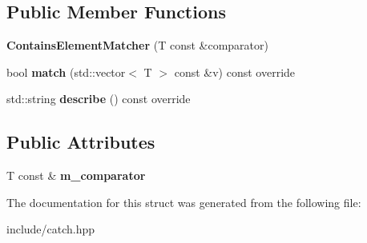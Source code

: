 \subsection*{Public Member Functions}
\begin{DoxyCompactItemize}
\item 
{\bfseries Contains\+Element\+Matcher} (T const \&comparator)\hypertarget{structCatch_1_1Matchers_1_1Vector_1_1ContainsElementMatcher_a6a05740b5d3f89fac8de84ac0cff7b93}{}\label{structCatch_1_1Matchers_1_1Vector_1_1ContainsElementMatcher_a6a05740b5d3f89fac8de84ac0cff7b93}

\item 
bool {\bfseries match} (std\+::vector$<$ T $>$ const \&v) const override\hypertarget{structCatch_1_1Matchers_1_1Vector_1_1ContainsElementMatcher_a6a4be6e5642e267433d370649beb0fac}{}\label{structCatch_1_1Matchers_1_1Vector_1_1ContainsElementMatcher_a6a4be6e5642e267433d370649beb0fac}

\item 
std\+::string {\bfseries describe} () const override\hypertarget{structCatch_1_1Matchers_1_1Vector_1_1ContainsElementMatcher_aea3b674389a0afd82af6ba4b10f86ae6}{}\label{structCatch_1_1Matchers_1_1Vector_1_1ContainsElementMatcher_aea3b674389a0afd82af6ba4b10f86ae6}

\end{DoxyCompactItemize}
\subsection*{Public Attributes}
\begin{DoxyCompactItemize}
\item 
T const \& {\bfseries m\+\_\+comparator}\hypertarget{structCatch_1_1Matchers_1_1Vector_1_1ContainsElementMatcher_ab7eada6c4bbce1d21b44773262f9cb23}{}\label{structCatch_1_1Matchers_1_1Vector_1_1ContainsElementMatcher_ab7eada6c4bbce1d21b44773262f9cb23}

\end{DoxyCompactItemize}


The documentation for this struct was generated from the following file\+:\begin{DoxyCompactItemize}
\item 
include/catch.\+hpp\end{DoxyCompactItemize}

